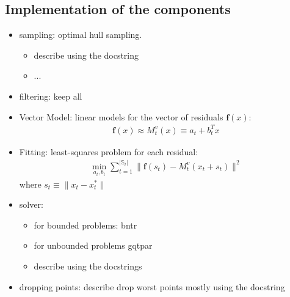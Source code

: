 

\subsection{Implementation of the components}


\begin{itemize}
    \item sampling: optimal hull sampling.
        \begin{itemize}
            \item describe using the docstring
            \item ...
        \end{itemize}
    \item filtering: keep all
    \item Vector Model:  linear models for the vector of residuals $\mathbf{f}(x)$:
    \begin{align}
        \mathbf{f}(x)\approx M^v_{t}(x) \equiv a_t+b_t^Tx
        \label{eq:model-linear}
    \end{align}
    \item Fitting: least-squares problem for each residual:
    \begin{align}
        \min\limits_{a_{t},b_{t}}\sum\limits_{t=1}^{|\mathbb{S}_t|}\lVert\mathbf{f}(s_t)-M_t^v(x_t+s_t)\rVert^2
        \label{eq:fit-linear}
    \end{align}
    where $s_t\equiv\lVert x_t-x_t^*\rVert$
    \item solver:
        \begin{itemize}
            \item for bounded problems: bntr
            \item for unbounded problems gqtpar
            \item describe using the docstrings
        \end{itemize}
    \item  dropping points: describe drop worst points mostly using the docstring
\end{itemize}
